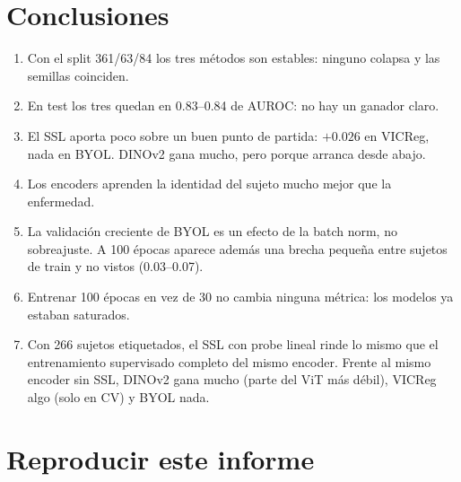 \documentclass[11pt,a4paper]{article}
\begin{document}
\section{Conclusiones}

\begin{enumerate}[leftmargin=16pt]
\item Con el split 361/63/84 los tres métodos son estables: ninguno colapsa y las semillas
  coinciden.
\item En test los tres quedan en 0.83--0.84 de AUROC: no hay un ganador claro.
\item El SSL aporta poco sobre un buen punto de partida: $+0.026$ en VICReg, nada en BYOL.
  DINOv2 gana mucho, pero porque arranca desde abajo.
\item Los encoders aprenden la identidad del sujeto mucho mejor que la enfermedad.
\item La validación creciente de BYOL es un efecto de la batch norm, no sobreajuste. A 100 épocas
  aparece además una brecha pequeña entre sujetos de train y no vistos (0.03--0.07).
\item Entrenar 100 épocas en vez de 30 no cambia ninguna métrica: los modelos ya estaban
  saturados.
\item Con 266 sujetos etiquetados, el SSL con probe lineal rinde lo mismo que el entrenamiento
  supervisado completo del mismo encoder. Frente al mismo encoder sin SSL, DINOv2 gana mucho
  (parte del ViT más débil), VICReg algo (solo en CV) y BYOL nada.
\end{enumerate}

\appendix
\section{Reproducir este informe}
\end{document}
